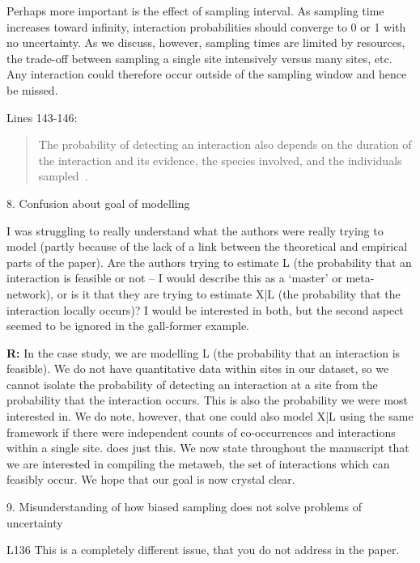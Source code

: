 \documentclass[12pt]{letter}
\newenvironment{refquote}{\bigskip \begin{it}}{\end{it}\smallskip}
\begin{document}
		Perhaps more important is the effect of sampling interval. As sampling time increases toward infinity, interaction probabilities should converge to 0 or 1 with no uncertainty. As we discuss, however, sampling times are limited by resources, the trade-off between sampling a single site intensively versus many sites, etc. Any interaction could therefore occur outside of the sampling window and hence be missed.


		Lines 143-146:


		\begin{quotation}
			The probability of detecting an interaction also depends on the duration of the interaction and its evidence, the species involved, and the individuals sampled~\citep{Wells2013,Lagrue2015,Cirtwill2016,Weinstein2017}. 
		\end{quotation}

	8. Confusion about goal of modelling


		\begin{refquote}
		I was struggling to really understand what the authors were really trying to model (partly because of the lack of a link between the theoretical and empirical parts of the paper). Are the authors trying to estimate L (the probability that an interaction is feasible or not – I would describe this as a `master' or meta- network), or is it that they are trying to estimate X|L (the probability that the interaction locally occurs)? I would be interested in both, but the second aspect seemed to be ignored in the gall-former example.
		\end{refquote}


		\textbf{R:} In the case study, we are modelling L (the probability that an interaction is feasible). We do not have quantitative data within sites in our dataset, so we cannot isolate the probability of detecting an interaction at a site from the probability that the interaction occurs. This is also the probability we were most interested in. We do note, however, that one could also model X|L using the same framework if there were independent counts of co-occurrences and interactions within a single site. \citet{Gravel2018} does just this. We now state throughout the manuscript that we are interested in compiling the metaweb, the set of interactions which can feasibly occur. We hope that our goal is now crystal clear.


	9. Misunderstanding of how biased sampling does not solve problems of uncertainty


		\begin{refquote}
		L136 This is a completely different issue, that you do not address in the paper.
		\end{refquote}
\end{document}
